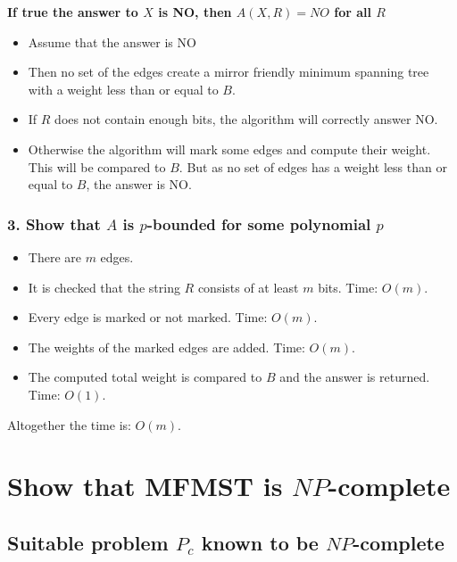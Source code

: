 \documentclass[12pt]{report}
\begin{document}
\textbf{If true the answer to $X$ is NO, then $A(X, R) = NO$ for all $R$}
\begin{itemize}
	\item[] Assume that the answer is NO
	
	\item[] Then no set of the edges create a mirror friendly minimum spanning tree with a weight less than or equal to $B$.
	
	\item[] If $R$ does not contain enough bits, the algorithm will correctly answer NO.
	
	\item[] Otherwise the algorithm will mark some edges and compute their weight. This will be compared to $B$. But as no set of edges has a weight less than or equal to $B$, the answer is NO.
\end{itemize}

\subsubsection{3. Show that $A$ is $p$-bounded for some polynomial $p$}
\begin{itemize}
	\item[] There are $m$ edges.
	
	\item[] It is checked that the string $R$ consists of at least $m$ bits. Time: $O(m)$.
	
	\item[] Every edge is marked or not marked. Time: $O(m)$.
	
	\item[] The weights of the marked edges are added. Time: $O(m)$.
	
	\item[] The computed total weight is compared to $B$ and the answer is returned. Time: $O(1)$.
\end{itemize}

Altogether the time is: $O(m)$.

\section{Show that MFMST is $NP$-complete}
\subsection{Suitable problem $P_c$ known to be $NP$-complete}
\end{document}
